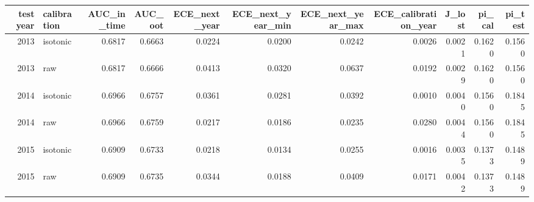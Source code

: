 \begin{tabular}{rlrrrrrrrrr}
\toprule
test year & calibration & AUC\_in\_time & AUC\_oot & ECE\_next\_year & ECE\_next\_year\_min & ECE\_next\_year\_max & ECE\_calibration\_year & J\_lost & pi\_cal & pi\_test \\
\midrule
2013 & isotonic & 0.6817 & 0.6663 & 0.0224 & 0.0200 & 0.0242 & 0.0026 & 0.0021 & 0.1620 & 0.1560 \\
2013 & raw & 0.6817 & 0.6666 & 0.0413 & 0.0320 & 0.0637 & 0.0192 & 0.0029 & 0.1620 & 0.1560 \\
2014 & isotonic & 0.6966 & 0.6757 & 0.0361 & 0.0281 & 0.0392 & 0.0010 & 0.0040 & 0.1560 & 0.1845 \\
2014 & raw & 0.6966 & 0.6759 & 0.0217 & 0.0186 & 0.0235 & 0.0280 & 0.0044 & 0.1560 & 0.1845 \\
2015 & isotonic & 0.6909 & 0.6733 & 0.0218 & 0.0134 & 0.0255 & 0.0016 & 0.0035 & 0.1373 & 0.1489 \\
2015 & raw & 0.6909 & 0.6735 & 0.0344 & 0.0188 & 0.0409 & 0.0171 & 0.0042 & 0.1373 & 0.1489 \\
\bottomrule
\end{tabular}
